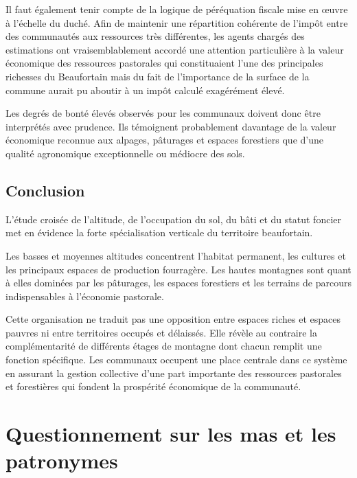 \documentclass[12pt,a4paper]{report}
\begin{document}
	Il faut également tenir compte de la logique de péréquation fiscale mise en œuvre à l'échelle du duché. Afin de maintenir une répartition cohérente de l'impôt entre des communautés aux ressources très différentes, les agents chargés des estimations ont vraisemblablement accordé une attention particulière à la valeur économique des ressources pastorales qui constituaient l'une des principales richesses du Beaufortain mais du fait de l'importance de la surface de la commune aurait pu aboutir à un impôt calculé exagérément élevé.
	
	Les degrés de bonté élevés observés pour les communaux doivent donc être interprétés avec prudence. Ils témoignent probablement davantage de la valeur économique reconnue aux alpages, pâturages et espaces forestiers que d'une qualité agronomique exceptionnelle ou médiocre des sols.
	
\subsection{Conclusion}
	
	L'étude croisée de l'altitude, de l'occupation du sol, du bâti et du statut foncier met en évidence la forte spécialisation verticale du territoire beaufortain.
	
	Les basses et moyennes altitudes concentrent l'habitat permanent, les cultures et les principaux espaces de production fourragère. Les hautes montagnes sont quant à elles dominées par les pâturages, les espaces forestiers et les terrains de parcours indispensables à l'économie pastorale.
	
	Cette organisation ne traduit pas une opposition entre espaces riches et espaces pauvres ni entre territoires occupés et délaissés. Elle révèle au contraire la complémentarité de différents étages de montagne dont chacun remplit une fonction spécifique. Les communaux occupent une place centrale dans ce système en assurant la gestion collective d'une part importante des ressources pastorales et forestières qui fondent la prospérité économique de la communauté.
	
	


\section{Questionnement sur les mas et les patronymes}
\end{document}
